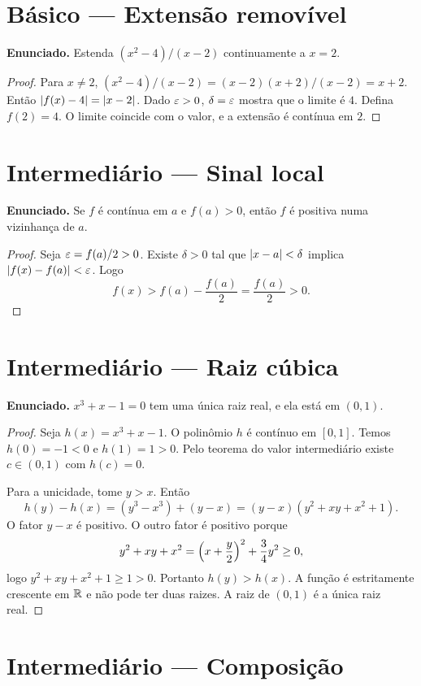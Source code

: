\documentclass[11pt,a4paper]{article}
\begin{document}
\section{B\'asico --- Extens\~ao remov\'ivel}

\textbf{Enunciado.} Estenda $(x^2-4)/(x-2)$ continuamente a $x=2$.

\begin{proof}
Para $x\neq 2$, $(x^2-4)/(x-2)=(x-2)(x+2)/(x-2)=x+2$. Ent\~ao $\left\lvert f(x)-4 \right\rvert=\left\lvert x-2 \right\rvert$. Dado $\varepsilon>0$, $\delta=\varepsilon$ mostra que o limite \'e $4$. Defina $f(2)=4$. O limite coincide com o valor, e a extens\~ao \'e cont\'inua em $2$.
\end{proof}

\section{Intermedi\'ario --- Sinal local}

\textbf{Enunciado.} Se $f$ \'e cont\'inua em $a$ e $f(a)>0$, ent\~ao $f$ \'e positiva numa vizinhan\c{c}a de $a$.

\begin{proof}
Seja $\varepsilon=f(a)/2>0$. Existe $\delta>0$ tal que $\left\lvert x-a \right\rvert<\delta$ implica $\left\lvert f(x)-f(a) \right\rvert<\varepsilon$. Logo
\[
f(x)>f(a)-\frac{f(a)}{2}=\frac{f(a)}{2}>0.
\]
\end{proof}

\section{Intermedi\'ario --- Raiz c\'ubica}

\textbf{Enunciado.} $x^3+x-1=0$ tem uma \'unica raiz real, e ela est\'a em $(0,1)$.

\begin{proof}
Seja $h(x)=x^3+x-1$. O polin\^omio $h$ \'e cont\'inuo em $[0,1]$. Temos $h(0)=-1<0$ e $h(1)=1>0$. Pelo teorema do valor intermedi\'ario existe $c\in(0,1)$ com $h(c)=0$.

Para a unicidade, tome $y>x$. Ent\~ao
\[
h(y)-h(x)=(y^3-x^3)+(y-x)=(y-x)(y^2+xy+x^2+1).
\]
O fator $y-x$ \'e positivo. O outro fator \'e positivo porque
\[
y^2+xy+x^2=\Bigl(x+\frac{y}{2}\Bigr)^2+\frac{3}{4}y^2\ge 0,
\]
logo $y^2+xy+x^2+1\ge 1>0$. Portanto $h(y)>h(x)$. A fun\c{c}\~ao \'e estritamente crescente em $\mathbb{R}$ e n\~ao pode ter duas raizes. A raiz de $(0,1)$ \'e a \'unica raiz real.
\end{proof}

\section{Intermedi\'ario --- Composi\c{c}\~ao}
\end{document}

